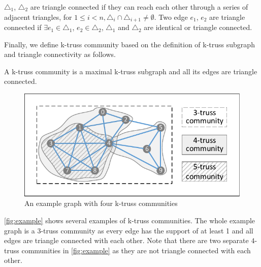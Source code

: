 \begin{Def} 
${\triangle}_{1}$, ${\triangle}_{2}$ are triangle connected if they can reach each other through a series of adjacent triangles, \ie for $1 \le i < n, {\triangle}_{i} \cap {\triangle}_{i+1} \neq \emptyset$. Two edge $e_1$, $e_2$ are triangle connected if $\exists e_{1} \in {\triangle}_{1}$, $e_{2} \in {\triangle}_{2}$, ${\triangle}_{1}$ and ${\triangle}_{2}$ are identical or triangle connected.
\label{def:triangle_connectivity}
\end{Def}


Finally, we define k-truss community based on the definition of k-truss subgraph and triangle connectivity as follows.

\begin{Def} 
A k-truss community is a maximal k-truss subgraph and all its edges are triangle connected.
\label{def:k-truss_community}
\end{Def}

\begin{figure}[ht]
    \centering
    \includegraphics[width=0.7\linewidth, trim={0.1cm 0.1cm, 0.1cm, 0.1cm}, clip]{./figures/k-truss.pdf}
    \caption{An example graph with four k-truss communities}
    \label{fig:example}
\end{figure}

\autoref{fig:example} shows several examples of k-truss communities. The whole example graph is a $3$-truss community as every edge has the support of at least 1 and all edges are triangle connected with each other. Note that there are two separate $4$-truss communities in \autoref{fig:example} as they are not triangle connected with each other.

